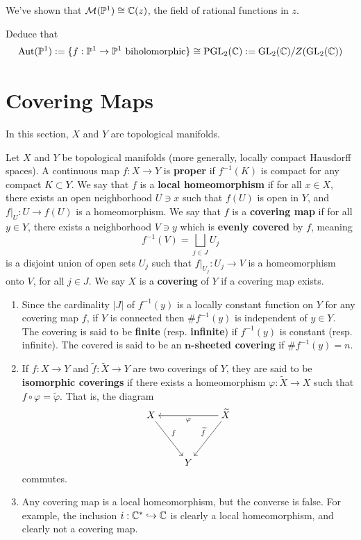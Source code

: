 \documentclass[11pt]{article}
\begin{document}
We've shown that $\mathcal M(\mathbb{P}^1) \cong \mathbb{C}(z)$, the field of rational functions in $z$.

\begin{exercise}
    Deduce that 
    $$\operatorname{Aut}(\mathbb{P}^1) := \{f:\mathbb{P}^1 \to \mathbb{P}^1 \text{ biholomorphic}\} \cong \operatorname{PGL}_2(\mathbb{C}) := \operatorname{GL}_2(\mathbb{C}) /Z(\operatorname{GL}_2(\mathbb{C}))$$
\end{exercise}

\section{Covering Maps}
In this section, $X$ and $Y$ are topological manifolds.

\begin{defn}
    Let $X$ and $Y$ be topological manifolds (more generally, locally compact Hausdorff spaces). A continuous map $f:X \to Y$ is \textbf{proper} if $f^{-1}(K)$ is compact for any compact $K \subset Y$. We say that $f$ is a \textbf{local homeomorphism} if for all $x \in X$, there exists an open neighborhood $U \ni x$ such that $f(U)$ is open in $Y$, and $f|_U:U \to f(U)$ is a homeomorphism. We say that $f$ is a \textbf{covering map} if for all $y \in Y$, there exists a neighborhood $V \ni y$ which is \textbf{evenly covered} by $f$, meaning 
    $$f^{-1}(V) = \bigsqcup_{j \in J}U_j$$
    is a disjoint union of open sets $U_j$ such that $f|_{U_j}:U_j \to V$ is a homeomorphism onto $V$, for all $j \in J$. We say $X$ is a \textbf{covering} of $Y$ if a covering map exists.
\end{defn}

\begin{rmk}
    \begin{enumerate}
        \item Since the cardinality $|J|$ of $f^{-1}(y)$ is a locally constant function on $Y$ for any covering map $f$, if $Y$ is connected then $\# f^{-1}(y)$ is independent of $y \in Y$. The covering is said to be \textbf{finite} (resp. \textbf{infinite}) if $f^{-1}(y)$ is constant (resp. infinite). The covered is said to be an $\bm n$\textbf{-sheeted covering} if $\#f^{-1}(y) = n$.
        \item If $f:X \to Y$ and $\tilde f:\tilde X \to Y$ are two coverings of $Y$, they are said to be \textbf{isomorphic coverings} if there exists a homeomorphism $\varphi :\tilde X \to X$ such that $f \circ \varphi = \tilde \varphi$. That is, the diagram
\[\begin{tikzcd}[ampersand replacement=\&,cramped]
	X \&\& {\tilde X} \\
	\\
	\& Y
	\arrow["f", from=1-1, to=3-2]
	\arrow["\varphi", from=1-3, to=1-1]
	\arrow["{\tilde f}"', from=1-3, to=3-2]
\end{tikzcd}\]
commutes.
\item Any covering map is a local homeomorphism, but the converse is false. For example, the inclusion $i : \mathbb{C}^* \hookrightarrow \mathbb{C}$ is clearly a local homeomorphism, and clearly not a covering map.
    \end{enumerate}
\end{rmk}
\end{document}
